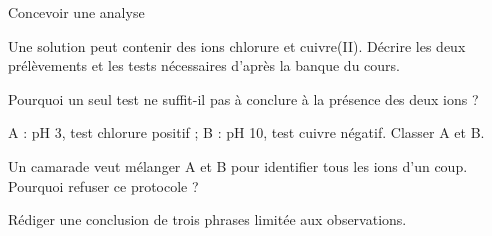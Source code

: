\par\noindent\begin{minipage}{\linewidth}
\begin{exercice}[3]{Concevoir une analyse}
\begin{questions}
\item Une solution peut contenir des ions chlorure et cuivre(II). Décrire les deux prélèvements et les tests nécessaires d’après la banque du cours.
\item Pourquoi un seul test ne suffit-il pas à conclure à la présence des deux ions ?
\end{questions}
\end{exercice}
\end{minipage}
\label{defi-ex-4}
\begin{questions}
\item A : pH 3, test chlorure positif ; B : pH 10, test cuivre négatif. Classer A et B.
\item Un camarade veut mélanger A et B pour identifier tous les ions d’un coup. Pourquoi refuser ce protocole ?
\item Rédiger une conclusion de trois phrases limitée aux observations.
\end{questions}
\pcGrille

